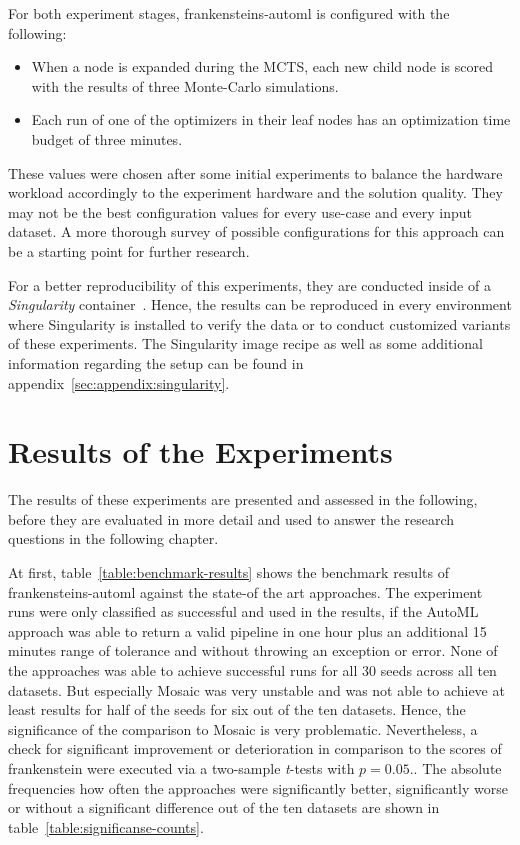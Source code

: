 For both experiment stages, frankensteins-automl is configured with the following:
\begin{itemize}
    \item When a node is expanded during the MCTS, each new child node is scored with the results of three Monte-Carlo simulations.
    \item Each run of one of the optimizers in their leaf nodes has an optimization time budget of three minutes.
\end{itemize}
These values were chosen after some initial experiments to balance the hardware workload accordingly to the experiment hardware and the solution quality.
They may not be the best configuration values for every use-case and every input dataset.
A more thorough survey of possible configurations for this approach can be a starting point for further research.

For a better reproducibility of this experiments, they are conducted inside of a \textit{Singularity} container~\cite{Kurtzer-Singularity}.
Hence, the results can be reproduced in every environment where Singularity is installed to verify the data or to conduct customized variants of these experiments.
The Singularity image recipe as well as some additional information regarding the setup can be found in appendix~\ref{sec:appendix:singularity}.

\section{Results of the Experiments}
\label{sec:evaluation:results}
 The results of these experiments are presented and assessed in the following, before they are evaluated in more detail and used to answer the research questions in the following chapter.

 At first, table~\ref{table:benchmark-results} shows the benchmark results of frankensteins-automl against the state-of the art approaches.
 The experiment runs were only classified as successful and used in the results, if the AutoML approach was able to return a valid pipeline in one hour plus an additional 15 minutes range of tolerance and without throwing an exception or error.
 None of the approaches was able to achieve successful runs for all 30 seeds across all ten datasets.
 But especially Mosaic was very unstable and was not able to achieve at least results for half of the seeds for six out of the ten datasets.
 Hence, the significance of the comparison to Mosaic is very problematic.\newline
 Nevertheless, a check for significant improvement or deterioration in comparison to the scores of frankenstein were executed via a two-sample \textit{t}-tests with $p = 0.05$..
 The absolute frequencies how often the approaches were significantly better, significantly worse or without a significant difference out of the ten datasets are shown in table~\ref{table:significanse-counts}.

